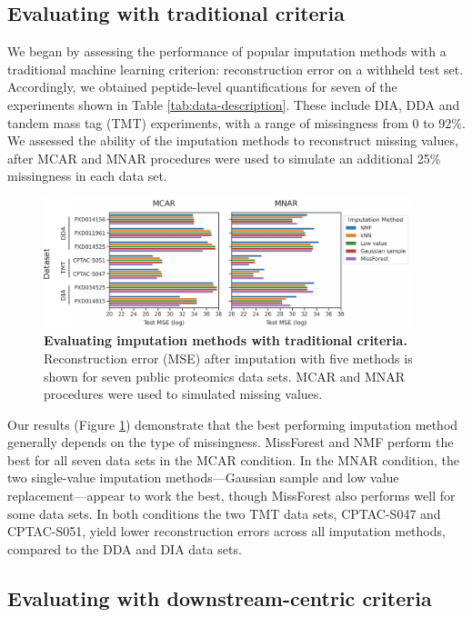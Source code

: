 \documentclass{article}
\begin{document}
\subsection{Evaluating with traditional criteria}

We began by assessing the performance of popular imputation methods with a traditional machine learning criterion: reconstruction error on a withheld test set. Accordingly, we obtained peptide-level quantifications for seven of the experiments shown in Table \ref{tab:data-description}. These include DIA, DDA and tandem mass tag (TMT) experiments, with a range of missingness from 0 to 92\%. We assessed the ability of the imputation methods to reconstruct missing values, after MCAR and MNAR procedures were used to simulate an additional 25\% missingness in each data set.

\begin{figure}
  \centering
  \includegraphics[width=0.95\textwidth]{figures/trad-barplots-w-labels-v4.pdf}
  \caption{{\bf Evaluating imputation methods with traditional criteria.} 
  Reconstruction error (MSE) after imputation with five methods is shown for seven public proteomics data sets. MCAR and MNAR procedures were used to simulated missing values.}
  \label{fig:traditional-eval}
\end{figure}

Our results (Figure \ref{fig:traditional-eval}) demonstrate that the best performing imputation method generally depends on the type of missingness. MissForest and NMF perform the best for all seven data sets in the MCAR condition. In the MNAR condition, the two single-value imputation methods---Gaussian sample and low value replacement---appear to work the best, though MissForest also performs well for some data sets. In both conditions the two TMT data sets, CPTAC-S047 and CPTAC-S051, yield lower reconstruction errors across all imputation methods, compared to the DDA and DIA data sets. 

\subsection{Evaluating with downstream-centric criteria}
\end{document}
